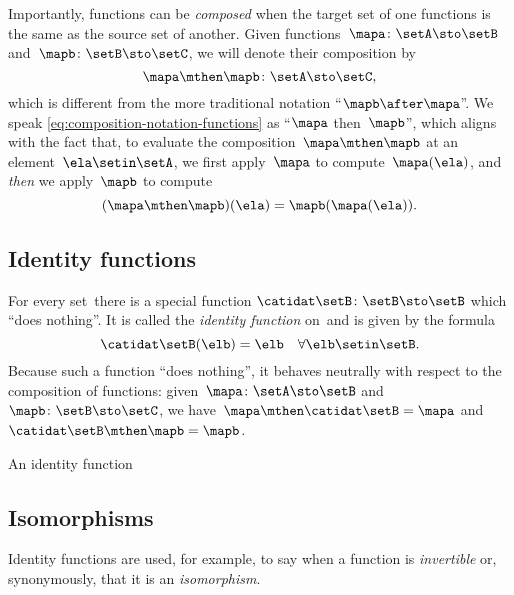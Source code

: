 Importantly, functions can be \emph{composed} when the target set of one functions is the same as the source set of another.
Given functions~$\mapa\colon \setA \sto \setB$ and~$\mapb \colon \setB \sto \setC$, we will denote their composition by
\begin{equation}
    \label{eq:composition-notation-functions}
    \mapa \mthen \mapb \colon \setA \sto \setC,
\end{equation}
which is different from the more traditional notation ``$\mapb \after \mapa$''.
We speak \cref{eq:composition-notation-functions} as ``$\mapa$ then~$\mapb$'', which aligns with the fact that, to evaluate the composition~$\mapa \mthen \mapb$ at an element~$\ela \setin\setA$, we first apply~$\mapa$ to compute~$\mapa(\ela)$, and \emph{then} we apply~$\mapb$ to compute
\begin{equation}
    (\mapa \mthen \mapb)(\ela)
    = \mapb(\mapa(\ela)).
\end{equation}

\subsection{Identity functions}

For every set~\setB there is a special function $\catidat\setB \colon \setB \sto \setB$ which ``does nothing''.
It is called the \emph{identity function} on~\setB and is given by the formula
\begin{equation}
    \catidat\setB(\elb) = \elb \quad \forall  \elb \setin\setB.
\end{equation}
Because such a function ``does nothing'', it behaves neutrally with respect to the composition of functions: given~$\mapa \colon \setA \sto \setB$ and~$\mapb \colon \setB \sto \setC$, we have~$\mapa \mthen \catidat\setB = \mapa$ and~$\catidat\setB \mthen \mapb = \mapb$.

\begin{marginfigure}
    \centering
    \caption{An identity function}
    \label{fig:identity-function}
\end{marginfigure}

\subsection{Isomorphisms}

Identity functions are used, for example, to say when a function is \emph{invertible} or, synonymously, that it is an \emph{isomorphism}.

